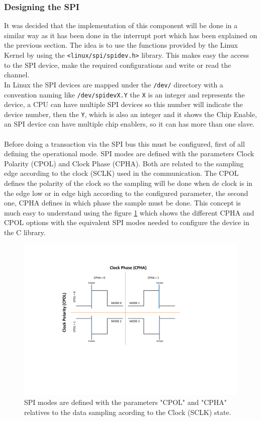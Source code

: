 \subsubsection{Designing the SPI}\label{SSS:IOSharp-SPI-Design}
It was decided that the implementation of this component will be done in a similar way as it has been done in the interrupt port which has been explained on the previous section. The idea is to use the functions provided by the Linux Kernel by using the \verb!<linux/spi/spidev.h>! library. This makes easy the access to the SPI device, make the required configurations and write or read the channel.
\\
In Linux the SPI devices are mapped under the \verb!/dev/! directory with a convention naming like \verb!/dev/spidevX.Y! the \verb!X! is an integer and represents the device, a CPU can have multiple SPI devices so this number will indicate the device number, then the \verb!Y!, which is also an integer and it shows the Chip Enable, an SPI device can have multiple chip enablers, so it can has more than one slave.
\\
\\
Before doing a transaction via the SPI bus this must be configured, first of all defining the operational mode. SPI modes are defined with the parameters Clock Polarity (CPOL) and Clock Phase (CPHA). Both are related to the sampling edge according to the clock (SCLK) used in the communication. The CPOL defines the polarity of the clock so the sampling will be done when de clock is in the edge low or in edge high according to the configured parameter, the second one, CPHA defines in which phase the sample must be done. This concept is much easy to understand using the figure \ref{fig:spi-modes} which shows the different CPHA and CPOL options with the equivalent SPI modes needed to configure the device in the C library.

\begin{figure}[H]\begin{center}
 \centering
  \captionsetup{justification=centering}
  \includegraphics[scale=0.7]{pictures/iosharp/spi-modes}
  \caption{SPI modes are defined with the parameters "CPOL" and "CPHA" relatives to the data sampling acording to the Clock (SCLK) state.\label{fig:spi-modes}}
\end{center}\end{figure}


